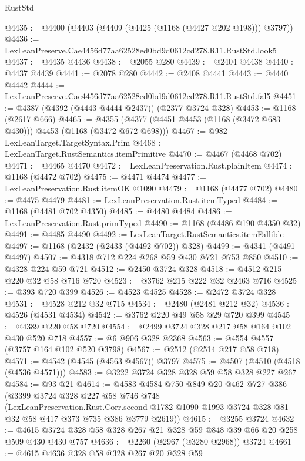 \begin{lexlean}{RustStd}
\begin{coremodule}
@4435 := @4400 (@4403 (@4409 (@4425 (@1168 (@4427 @202 @198))) @3797))
@4436 := LexLeanPreserve.Cae4456d77aa62528ed0bd9d0612cd278.R11.RustStd.look5
@4437 := @4435 @4436
@4438 := @2055 @280
@4439 := @2404 @4438
@4440 := @4437 @4439
@4441 := @2078 @280
@4442 := @2408 @4441
@4443 := @4440 @4442
@4444 := LexLeanPreserve.Cae4456d77aa62528ed0bd9d0612cd278.R11.RustStd.fal5
@4451 := @4387 (@4392 (@4443 @4444 @2437)) (@2377 @3724 @328)
@4453 := @1168 (@2617 @666)
@4465 := @4355 (@4377 (@4451 @4453 (@1168 (@3472 @683 @430))) @4453 (@1168 (@3472 @672 @698)))
@4467 := @982 LexLeanTarget.TargetSyntax.Prim
@4468 := LexLeanTarget.RustSemantics.itemPrimitive
@4470 := @4467 (@4468 @702)
@4471 := @4465 @4470
@4472 := LexLeanPreservation.Rust.plainItem
@4474 := @1168 (@4472 @702)
@4475 := @4471 @4474
@4477 := LexLeanPreservation.Rust.itemOK @1090
@4479 := @1168 (@4477 @702)
@4480 := @4475 @4479
@4481 := LexLeanPreservation.Rust.itemTyped
@4484 := @1168 (@4481 @702 @4350)
@4485 := @4480 @4484
@4486 := LexLeanPreservation.Rust.primTyped
@4490 := @1168 (@4486 @190 @4350 @32)
@4491 := @4485 @4490
@4492 := LexLeanTarget.RustSemantics.itemFallible
@4497 := @1168 (@2432 (@2433 (@4492 @702)) @328)
@4499 := @4341 (@4491 @4497)
@4507 := @4318 @712 @224 @268 @59 @430 @721 @753 @850
@4510 := @4328 @224 @59 @721
@4512 := @2450 @3724 @328
@4518 := @4512 @215 @220 @32 @58 @716 @720
@4523 := @3762 @215 @222 @32 @2463 @716
@4525 := @393 @720 @399
@4526 := @4523 @4525
@4528 := @2472 @3724 @328
@4531 := @4528 @212 @32 @715
@4534 := @2480 (@2481 @212 @32)
@4536 := @4526 (@4531 @4534)
@4542 := @3762 @220 @49 @58 @29 @720 @399
@4545 := @4389 @220 @58 @720
@4554 := @2499 @3724 @328 @217 @58 @164 @102 @430 @520 @718
@4557 := @6 @906 @328 @2368
@4563 := @4554 @4557 (@3757 @164 @102 @520 @3798)
@4567 := @2512 (@2514 @217 @58 @718)
@4571 := @4542 (@4545 (@4563 @4567)) @3797
@4575 := @4507 (@4510 (@4518 (@4536 @4571)))
@4583 := @3222 @3724 @328 @328 @59 @58 @328 @227 @267
@4584 := @93 @21
@4614 := @4583
    @4584
    @750
    @849
    @20
    @462
    @727
    @386
    (@3399
      @3724
      @328
      @227
      @58
      @746
      @748
      (LexLeanPreservation.Rust.Corr.second
        @1782
        @1090
        @1993
        @3724
        @328
        @81
        @32
        @58
        @417
        @373
        @735
        @386
        @3779
        @2619))
@4615 := @3255 @3724
@4632 := @4615 @3724 @328 @58 @328 @267 @21 @328 @59 @848 @39 @66 @20 @258 @509 @430 @430 @757
@4636 := @2260 (@2967 (@3280 @2968)) @3724
@4661 := @4615
    @4636
    @328
    @58
    @328
    @267
    @20
    @328
    @59

\end{coremodule}
\end{lexlean}
